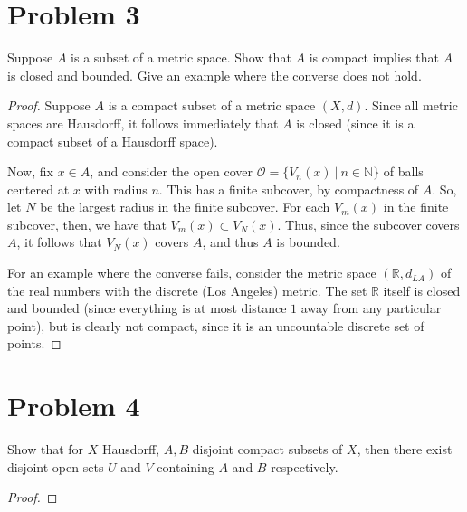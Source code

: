 \documentclass[fontsize=11pt]{scrartcl} %
\numberwithin{equation}{section} %
\numberwithin{figure}{section} %
\numberwithin{table}{section} %
\newcommand{\R}{\mathbb{R}}
\newcommand{\N}{\mathbb{N}}
\begin{document}
\section*{Problem 3}
Suppose $A$ is a subset of a metric space. Show that $A$ is compact implies that
$A$ is closed and bounded. Give an example where the converse does not hold.
\\
\begin{proof}
    Suppose $A$ is a compact subset of a metric space $(X,d)$. Since all metric
    spaces are Hausdorff, it follows immediately that $A$ is closed (since it is
    a compact subset of a Hausdorff space).

    Now, fix $x\in A$, and consider the open cover $\mathscr{O} = \{V_n(x)\ |\
    n\in\N\}$ of balls centered at $x$ with radius $n$. This has a finite
    subcover, by compactness of $A$. So, let $N$ be the largest radius in the
    finite subcover. For each $V_m(x)$ in the finite subcover, then, we have
    that $V_m(x)\subset V_N(x)$. Thus, since the subcover covers $A$, it follows
    that $V_N(x)$ covers $A$, and thus $A$ is bounded.

    For an example where the converse fails, consider the metric space
    $(\R,d_{LA})$ of the real numbers with the discrete (Los Angeles) metric.
    The set $\R$ itself is closed and bounded (since everything is at most
    distance $1$ away from any particular point), but is clearly not compact,
    since it is an uncountable discrete set of points.
\end{proof}

\section*{Problem 4}
Show that for $X$ Hausdorff, $A,B$ disjoint compact subsets of $X$, then there
exist disjoint open sets $U$ and $V$ containing $A$ and $B$ respectively.
\\
\begin{proof}

\end{proof}
\end{document}
